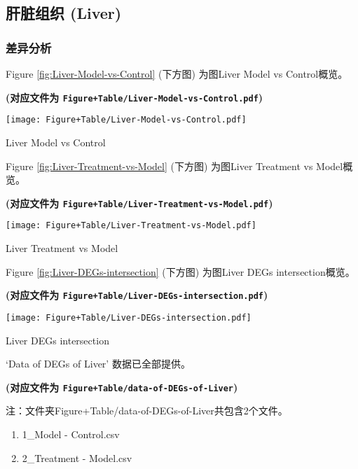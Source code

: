 \documentclass[
]{article}
\providecommand{\tightlist}{%
  \setlength{\itemsep}{0pt}\setlength{\parskip}{0pt}}
\begin{document}
\hypertarget{ux809dux810fux7ec4ux7ec7-liver}{%
\subsection{肝脏组织 (Liver)}\label{ux809dux810fux7ec4ux7ec7-liver}}

\hypertarget{liver-deg}{%
\subsubsection{差异分析}\label{liver-deg}}

Figure \ref{fig:Liver-Model-vs-Control} (下方图) 为图Liver Model vs Control概览。

\textbf{(对应文件为 \texttt{Figure+Table/Liver-Model-vs-Control.pdf})}

\def\@captype{figure}
\begin{center}
\texttt{[image: Figure+Table/Liver-Model-vs-Control.pdf]}
\caption{Liver Model vs Control}\label{fig:Liver-Model-vs-Control}
\end{center}

Figure \ref{fig:Liver-Treatment-vs-Model} (下方图) 为图Liver Treatment vs Model概览。

\textbf{(对应文件为 \texttt{Figure+Table/Liver-Treatment-vs-Model.pdf})}

\def\@captype{figure}
\begin{center}
\texttt{[image: Figure+Table/Liver-Treatment-vs-Model.pdf]}
\caption{Liver Treatment vs Model}\label{fig:Liver-Treatment-vs-Model}
\end{center}

Figure \ref{fig:Liver-DEGs-intersection} (下方图) 为图Liver DEGs intersection概览。

\textbf{(对应文件为 \texttt{Figure+Table/Liver-DEGs-intersection.pdf})}

\def\@captype{figure}
\begin{center}
\texttt{[image: Figure+Table/Liver-DEGs-intersection.pdf]}
\caption{Liver DEGs intersection}\label{fig:Liver-DEGs-intersection}
\end{center}

`Data of DEGs of Liver' 数据已全部提供。

\textbf{(对应文件为 \texttt{Figure+Table/data-of-DEGs-of-Liver})}

\begin{center}\begin{tcolorbox}[colback=gray!10, colframe=gray!50, width=0.9\linewidth, arc=1mm, boxrule=0.5pt]注：文件夹Figure+Table/data-of-DEGs-of-Liver共包含2个文件。

\begin{enumerate}\tightlist
\item 1\_Model - Control.csv
\item 2\_Treatment - Model.csv
\end{enumerate}\end{tcolorbox}
\end{center}
\end{document}
